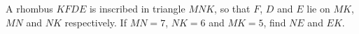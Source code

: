 A rhombus $KFDE$ is inscribed in triangle $MNK$, so that $F$, $D$ and $E$ lie on $MK$, $MN$ and $NK$ respectively. If $MN=7$, $NK=6$ and $MK=5$, find $NE$ and $EK$.
